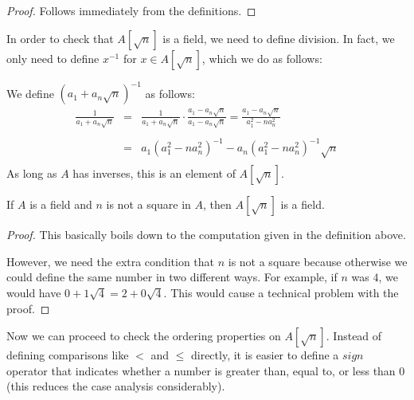 \begin{proof}
  Follows immediately from the definitions.
\end{proof}


In order to check that $A[\sqrt{n}]$ is a field, we need to define division. In
fact, we only need to define $x^{-1}$ for $x ∈ A[\sqrt{n}]$, which we do as
follows:

\begin{definition}
  \label{def:adjoinInv}
  \leanok
  We define $(a_1 + a_n\sqrt{n})^{-1}$ as follows:
  \begin{eqnarray*}
    \frac{1}{a_1 + a_n\sqrt{n}}
      & = & \frac{1}{a_1 + a_n\sqrt{n}} \cdot \frac{a_1 - a_n\sqrt{n}}{a_1 - a_n\sqrt{n}}
        =   \frac{a_1 - a_n\sqrt{n}}{a_1^2 - na_n^2} \\ \\
      & = & a_1(a_1^2 - na_n^2)^{-1} - a_n(a_1^2 - na_n^2)^{-1}\sqrt{n} \\
  \end{eqnarray*}
  As long as $A$ has inverses, this is an element of $A[\sqrt{n}]$.
\end{definition}

\begin{lemma}
  \label{thm:adjoinField}
  \leanok
  If $A$ is a field and $n$ is not a square in $A$, then $A[\sqrt{n}]$ is a
  field.
\end{lemma}

\begin{proof}
  \leanok
  This basically boils down to the computation given in the definition above.

  However, we need the extra condition that $n$ is not a square because
  otherwise we could define the same number in two different ways. For example,
  if $n$ was $4$, we would have $0 + 1\sqrt{4} = 2 + 0\sqrt{4}$. This would
  cause a technical problem with the proof.
\end{proof}


Now we can proceed to check the ordering properties on $A[\sqrt{n}]$. Instead
of defining comparisons like $<$ and $≤$ directly, it is easier to define a
$sign$ operator that indicates whether a number is greater than, equal to,
or less than 0 (this reduces the case analysis considerably).

